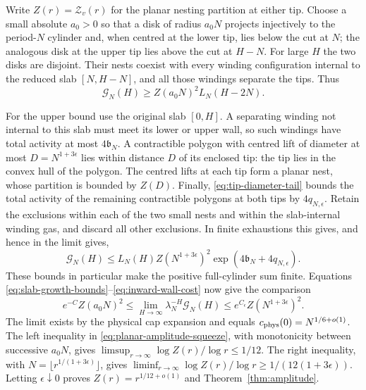 Write $Z(r)=\mathcal Z_v(r)$ for the planar nesting partition at either
tip. Choose a small absolute $a_0>0$ so that a disk of radius $a_0N$
projects injectively to the period-$N$ cylinder and, when centred at
the lower tip, lies below the cut at $N$; the analogous disk at the
upper tip lies above the cut at $H-N$. For large $H$ the two disks are
disjoint. Their nests coexist with every winding configuration internal
to the reduced slab $[N,H-N]$, and all those windings separate the tips.
Thus
\[
 \mathcal G_N(H)\ge Z(a_0N)^2L_N(H-2N).
\]

For the upper bound use the original slab $[0,H]$. A separating winding
not internal to this slab must meet its lower or upper wall, so such
windings have total activity at most $4\mathfrak b_N$. A contractible
polygon with centred lift of diameter at most
$D=N^{1+3\epsilon}$ lies within distance $D$ of its enclosed tip: the
tip lies in the convex hull of the polygon. The centred lifts at each
tip form a planar nest, whose partition is bounded by $Z(D)$. Finally,
\eqref{eq:tip-diameter-tail} bounds the total activity of the remaining
contractible polygons at both tips by $4q_{N,\epsilon}$. Retain the
exclusions within each of the two small nests and within the
slab-internal winding gas, and discard all other exclusions. In finite
exhaustions this gives, and hence in the limit gives,
\[
 \mathcal G_N(H)\le
 L_N(H)Z(N^{1+3\epsilon})^2
           \exp(4\mathfrak b_N+4q_{N,\epsilon}).
\]
These bounds in particular make the positive full-cylinder sum finite.
Equations \eqref{eq:slab-growth-bounds}--\eqref{eq:inward-wall-cost} now
give the comparison
\begin{equation}\label{eq:planar-amplitude-squeeze}
 e^{-C}Z(a_0N)^2\le
 \lim_{H\to\infty}\lambda_N^{-H}\mathcal G_N(H)
 \le e^{C_\epsilon}Z(N^{1+3\epsilon})^2.
\end{equation}
The limit exists by the physical cap expansion and equals
$c_{\rm phys}(0)=N^{1/6+o(1)}$. The left inequality in
\eqref{eq:planar-amplitude-squeeze}, with monotonicity between successive
$a_0N$, gives
$\limsup_{r\to\infty}\log Z(r)/\log r\le1/12$. The right inequality,
with $N=\lfloor r^{1/(1+3\epsilon)}\rfloor$, gives
$\liminf_{r\to\infty}\log Z(r)/\log r\ge1/(12(1+3\epsilon))$.
Letting $\epsilon\downarrow0$ proves
$Z(r)=r^{1/12+o(1)}$ and Theorem~\ref{thm:amplitude}.
